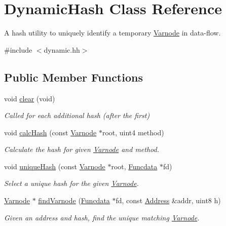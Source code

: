 \hypertarget{class_dynamic_hash}{}\section{Dynamic\+Hash Class Reference}
\label{class_dynamic_hash}


A hash utility to uniquely identify a temporary \mbox{\hyperlink{class_varnode}{Varnode}} in data-\/flow.  




{\ttfamily \#include $<$dynamic.\+hh$>$}

\subsection*{Public Member Functions}
\begin{DoxyCompactItemize}
\item 
void \mbox{\hyperlink{class_dynamic_hash_aa260964020db06dfcee8565544aa3b96}{clear}} (void)
\begin{DoxyCompactList}\small\item\em Called for each additional hash (after the first) \end{DoxyCompactList}\item 
void \mbox{\hyperlink{class_dynamic_hash_ae48f268d1cc95b75aeda1b6d563df0a9}{calc\+Hash}} (const \mbox{\hyperlink{class_varnode}{Varnode}} $\ast$root, uint4 method)
\begin{DoxyCompactList}\small\item\em Calculate the hash for given \mbox{\hyperlink{class_varnode}{Varnode}} and method. \end{DoxyCompactList}\item 
void \mbox{\hyperlink{class_dynamic_hash_a9255e5fffe4408f9e3f84a3f0847527e}{unique\+Hash}} (const \mbox{\hyperlink{class_varnode}{Varnode}} $\ast$root, \mbox{\hyperlink{class_funcdata}{Funcdata}} $\ast$fd)
\begin{DoxyCompactList}\small\item\em Select a unique hash for the given \mbox{\hyperlink{class_varnode}{Varnode}}. \end{DoxyCompactList}\item 
\mbox{\hyperlink{class_varnode}{Varnode}} $\ast$ \mbox{\hyperlink{class_dynamic_hash_a0fa4ec613c4bcd4954034e774abee892}{find\+Varnode}} (\mbox{\hyperlink{class_funcdata}{Funcdata}} $\ast$fd, const \mbox{\hyperlink{class_address}{Address}} \&addr, uint8 h)
\begin{DoxyCompactList}\small\item\em Given an address and hash, find the unique matching \mbox{\hyperlink{class_varnode}{Varnode}}. \end{DoxyCompactList}\item 

\end{DoxyCompactItemize}
